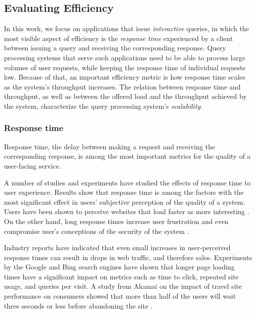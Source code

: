 \subsection{Evaluating Efficiency}

In this work, we focus on applications that issue \textit{interactive} queries,
in which the most visible aspect of efficiency is the \textit{response time} experienced by a client between issuing
a query and receiving the corresponding response.
Query processing systems that serve such applications need to be able to process large volumes of user requests,
while keeping the response time of individual requests low.
Because of that, an important efficiency metric is how response time scales as the system's throughput increases.
The relation between response time and throughput, as well as between the offered load and the throughput achieved by the system,
characterize the query processing system's \textit{scalability}.

\subsubsection{Response time}
Response time, the delay between making a request and receiving the corresponding response,
is among the most important metrics for the quality of a user-facing service.

A number of studies and experiments have studied the effects of response time to user experience.
Results show that response time is among the factors with the most significant effect in users' subjective perception
of the quality of a system.
Users have been shown to perceive websites that load faster as more interesting \cite{ramsay/retrievaltimesinvestigation}.
On the other hand, long response times increase user frustration \cite{ceaparu:userfrustration} and even compromise
user's conceptions of the security of the system \cite{bouch:qualityeyebeholder}.

Industry reports have indicated that even small increases in user-perceived response times can result in drops in web
traffic, and therefore sales.
Experiments by the Google and Bing search engines have shown that longer page loading times have a significant impact on
metrics such as time to click, repeated site usage, and queries per visit.
A study from Akamai on the impact of travel site performance on consumers showed that more than half of the users will
wait three seconds or less before abandoning the site \cite{akamai:travelsiteperformance}.

